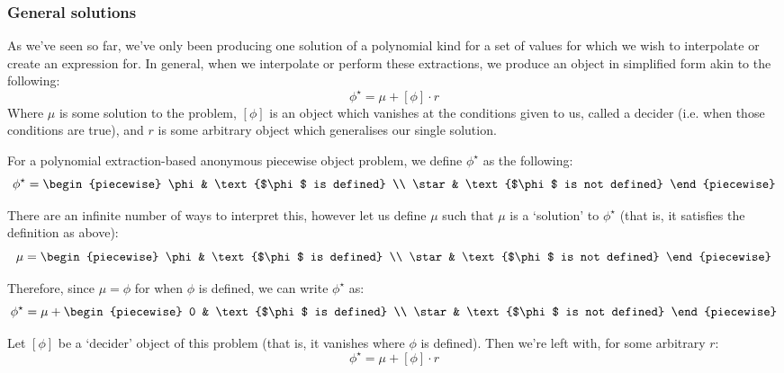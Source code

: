 \subsubsection{General solutions}
As we've seen so far, we've only been producing one solution of a polynomial kind for a set of values for which we wish to interpolate or create an expression for. In general, when we interpolate or perform these extractions, we produce an object in simplified form akin to the following:
$$
    \phi^\star = \mu + [\phi]\cdot r
$$
Where $\mu$ is some solution to the problem, $[\phi]$ is an object which vanishes at the conditions given to us, called a decider (i.e. when those conditions are true), and $r$ is some arbitrary object which generalises our single solution.

\begin{theorem}
    For a polynomial extraction-based anonymous piecewise object problem, we define $\phi^\star$ as the following:
    $$
        \phi^\star = \begin{piecewise}
            \phi & \text{$\phi$ is defined} \\
            \star & \text{$\phi$ is not defined}
        \end{piecewise}
    $$

    There are an infinite number of ways to interpret this, however let us define $\mu$ such that $\mu$ is a `solution' to $\phi^\star$ (that is, it satisfies the definition as above):
    $$
        \mu = \begin{piecewise}
            \phi & \text{$\phi$ is defined} \\
            \star & \text{$\phi$ is not defined}
        \end{piecewise}
    $$

    Therefore, since $\mu=\phi$ for when $\phi$ is defined, we can write $\phi^\star$ as:
    $$
        \phi^\star = \mu + \begin{piecewise}
            0 & \text{$\phi$ is defined} \\
            \star & \text{$\phi$ is not defined}
        \end{piecewise}
    $$

    Let $[\phi]$ be a `decider' object of this problem (that is, it vanishes where $\phi$ is defined). Then we're left with, for some arbitrary $r$:
    $$
        \phi^\star = \mu + [\phi]\cdot r
    $$
\end{theorem}

